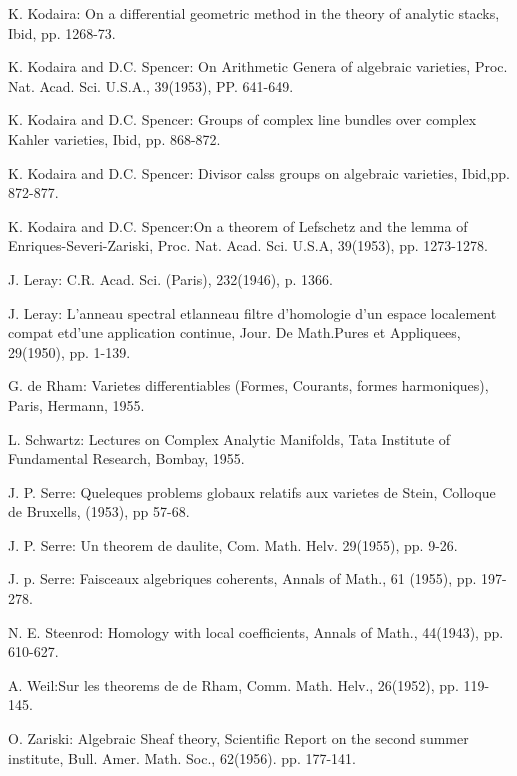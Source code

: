 \begin{thebibliography}{99}
 {K. Kodaira}: On a differential geometric method in the
  theory of analytic stacks, Ibid, pp. 1268-73.  

 {K. Kodaira and D.C. Spencer}: On Arithmetic Genera of
  algebraic varieties, Proc. Nat. Acad. Sci. U.S.A.,
  39(1953), PP. 641-649. 

 {K. Kodaira and D.C. Spencer}: Groups of complex line
  bundles over complex Kahler varieties, Ibid, pp. 868-872. 

 {K. Kodaira and D.C. Spencer}: Divisor calss groups on
  algebraic varieties, Ibid,pp. 872-877. 

 {K. Kodaira and D.C. Spencer}:\pageoriginale On a
  theorem of Lefschetz 
  and the lemma of Enriques-Severi-Zariski,
  Proc. Nat. Acad. Sci. U.S.A, 39(1953), pp. 1273-1278. 

 {J. Leray}: C.R. Acad. Sci. (Paris), 232(1946), p. 1366. 

 {J. Leray}: L'anneau spectral etlanneau filtre d'homologie
  d'un espace localement compat etd'une application continue, Jour. De
  Math.Pures et Appliquees, 29(1950), pp. 1-139. 

 {G. de Rham}: Varietes differentiables (Formes, Courants,
  formes harmoniques), Paris, Hermann, 1955. 

 {L. Schwartz}: Lectures on Complex Analytic Manifolds,
  Tata Institute of Fundamental Research, Bombay, 1955.  

 {J. P. Serre}: Queleques problems globaux relatifs aux
  varietes de Stein, Colloque de Bruxells, (1953), pp 57-68. 

 {J. P. Serre}: Un theorem de daulite,
  Com. Math. Helv. 29(1955), pp. 9-26. 

 {J. p. Serre}: Faisceaux algebriques coherents, Annals of
  Math., 61 (1955), pp. 197-278. 

 {N. E. Steenrod}: Homology with local coefficients, Annals
  of Math., 44(1943), pp. 610-627. 

 {A. Weil}:\pageoriginale Sur les theorems de de Rham,
  Comm. Math. Helv., 26(1952), pp. 119-145.  

 {O. Zariski}: Algebraic Sheaf theory, Scientific Report on
  the second summer institute, Bull. Amer. Math. Soc.,
  62(1956). pp. 177-141. 
\end{thebibliography} 

